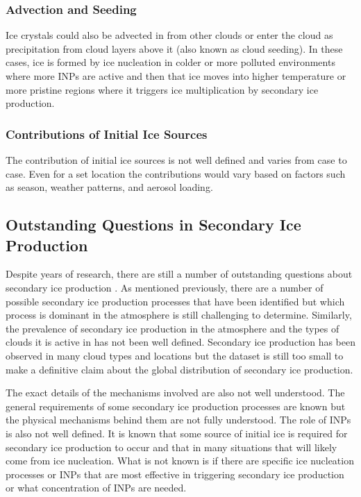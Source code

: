 \subsubsection{Advection and Seeding}
Ice crystals could also be advected in from other clouds or enter the cloud as precipitation from cloud layers above it (also known as cloud seeding). In these cases, ice is formed by ice nucleation in colder or more polluted environments where more INPs are active and then that ice moves into higher temperature or more pristine regions where it triggers ice multiplication by secondary ice production.

\subsubsection{Contributions of Initial Ice Sources}
The contribution of initial ice sources is not well defined and varies from case to case. Even for a set location the contributions would vary based on factors such as season, weather patterns, and aerosol loading.

\subsection{Outstanding Questions in Secondary Ice Production}
Despite years of research, there are still a number of outstanding questions about secondary ice production \citep{field2017,kei2020 ghbn  }. As mentioned previously, there are a number of possible secondary ice production processes that have been identified but which process is dominant in the atmosphere is still challenging to determine. Similarly, the prevalence of secondary ice production in the atmosphere and the types of clouds it is active in has not been well defined. Secondary ice production has been observed in many cloud types and locations but the dataset is still too small to make a definitive claim about the global distribution of secondary ice production. 

The exact details of the mechanisms involved are also not well understood. The general requirements of some secondary ice production processes are known but the physical mechanisms behind them are not fully understood. The role of INPs is also not well defined. It is known that some source of initial ice is required for secondary ice production to occur and that in many situations that will likely come from ice nucleation. What is not known is if there are specific ice nucleation processes or INPs that are most effective in triggering secondary ice production or what concentration of INPs are needed. 

